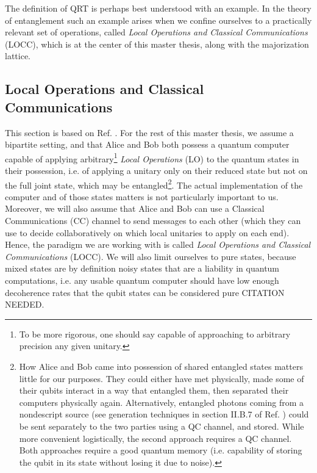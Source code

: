 The definition of QRT is perhaps best understood with an example. In the theory of entanglement such an example arises when we confine ourselves to a practically relevant set of operations, called \textit{Local Operations and Classical Communications} (LOCC), which is at the center of this master thesis, along with the majorization lattice.




\subsection{Local Operations and Classical Communications} \label{sec:LOCC}

This section is based on Ref. \cite[pp. 19--21]{chitambar_quantum_2019}%
. For the rest of this master thesis, we assume a bipartite setting, and that Alice and Bob both possess a quantum computer capable of applying arbitrary\footnote{To be more rigorous, one should say capable of approaching to arbitrary precision any given unitary.} \textit{Local Operations} (LO) to the quantum states in their possession, i.e. of applying a unitary only on their reduced state but not on the full joint state, which may be entangled\footnote{How Alice and Bob came into possession of shared entangled states matters little for our purposes. They could either have met physically, made some of their qubits interact in a way that entangled them, then separated their computers physically again. Alternatively, entangled photons coming from a nondescript source (see generation techniques in section II.B.7 of Ref. \cite{weedbrook_gaussian_2012}) could be sent separately to the two parties using a QC channel, and stored. While more convenient logistically, the second approach requires a QC channel. Both approaches require a good quantum memory (i.e. capability of storing the qubit in its state without losing it due to noise).}. The actual implementation of the computer and of those states matters is not particularly important to us. Moreover, we will also assume that Alice and Bob can use a Classical Communications (CC) channel to send messages to each other (which they can use to decide collaboratively on which local unitaries to apply on each end). Hence, the paradigm we are working with is called \textit{Local Operations and Classical Communications} (LOCC). We will also limit ourselves to pure states, because mixed states are by definition noisy states that are a liability in quantum computations, i.e. any usable quantum computer should have low enough decoherence rates that the qubit states can be considered pure CITATION NEEDED.

